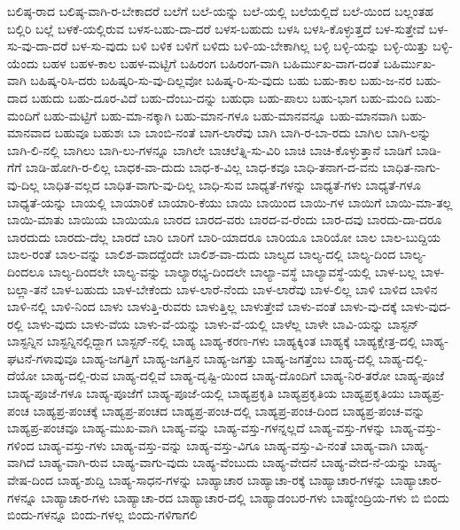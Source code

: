 {ಬಲಿಷ್ಠ-ರಾದ
ಬಲಿಷ್ಠ-ವಾಗಿ-ರ-ಬೇಕಾದರೆ
ಬಲೆಗೆ
ಬಲೆ-ಯನ್ನು
ಬಲೆ-ಯಲ್ಲಿ
ಬಲೆಯಲ್ಲಿದೆ
ಬಲೆ-ಯಿಂದ
ಬಲ್ಲಂತಹ
ಬಲ್ಲಿರಿ
ಬಲ್ಲೆ
ಬಳಕೆ-ಯಲ್ಲಿರುವ
ಬಳಸ-ಬಹು-ದಾ-ದರೆ
ಬಳಸ-ಬಹುದು
ಬಳಸಿ
ಬಳಸಿ-ಕೊಳ್ಳುತ್ತದೆ
ಬಳ-ಸುತ್ತೇವೆ
ಬಳ-ಸು-ವು-ದಾ-ದರೆ
ಬಳ-ಸು-ವುದು
ಬಳಿ
ಬಳಿಕ
ಬಳಿಗೆ
ಬಳಿದು
ಬಳಿ-ಯ-ಬೇಕಾಗಿಲ್ಲ
ಬಳ್ಳಿ
ಬಳ್ಳಿ-ಯನ್ನು
ಬಳ್ಳಿ-ಯಿತ್ತು
ಬಳ್ಳಿ-ಯೆಂದು
ಬಹಳ
ಬಹಳ-ಕಾಲ
ಬಹಳ-ಮಟ್ಟಿಗೆ
ಬಹಿರಂಗ
ಬಹಿರಂಗ-ವಾಗಿ
ಬಹಿರ್ಮುಖ-ವಾಗ-ದಂತೆ
ಬಹಿರ್ಮುಖ-ವಾಗಿ
ಬಹಿಷ್ಕ-ರಿಸಿ-ದರು
ಬಹಿಷ್ಕರಿ-ಸು-ವು-ದಿಲ್ಲವೋ
ಬಹಿಷ್ಕ-ರಿ-ಸು-ವುದು
ಬಹು
ಬಹು-ಕಾಲ
ಬಹು-ಜ-ನರ
ಬಹು-ದಾದ
ಬಹುದು
ಬಹು-ದೂರ-ವಿದೆ
ಬಹು-ದೆಂಬು-ದನ್ನು
ಬಹುಧಾ
ಬಹು-ಪಾಲು
ಬಹು-ಭಾಗ
ಬಹು-ಮಂದಿ
ಬಹು-ಮಂದಿಗೆ
ಬಹು-ಮಟ್ಟಿಗೆ
ಬಹು-ಮಾ-ನಕ್ಕಾಗಿ
ಬಹು-ಮಾನ-ಗಳೂ
ಬಹು-ಮಾನವನ್ನೂ
ಬಹು-ಮಾನವಾಗಿ
ಬಹು-ಮಾನವಾದ
ಬಹುವೂ
ಬಹುಶಃ
ಬಾ
ಬಾಂಬಿ-ನಂತೆ
ಬಾಗ-ಲಾರೆವು
ಬಾಗಿ
ಬಾಗಿ-ರ-ಬಾ-ರದು
ಬಾಗಿಲ
ಬಾಗಿ-ಲನ್ನು
ಬಾಗಿ-ಲಿ-ನಲ್ಲಿ
ಬಾಗಿಲು
ಬಾಗಿ-ಲು-ಗಳನ್ನೂ
ಬಾಗಿಲೇ
ಬಾಚಲೆತ್ನಿ-ಸು-ವಿರಿ
ಬಾಚಿ
ಬಾಚಿ-ಕೊಳ್ಳುತ್ತಾನೆ
ಬಾಡಿಗೆ
ಬಾಡಿ-ಗೆಗೆ
ಬಾಡಿ-ಹೋಗಿ-ರ-ಲಿಲ್ಲ
ಬಾಧಕ-ವಾ-ದುದು
ಬಾಧ-ಕ-ವಿಲ್ಲ
ಬಾಧ-ಕವೂ
ಬಾಧಿ-ತನಾಗ-ದ-ವನು
ಬಾಧಿತ-ನಾಗು-ವು-ದಿಲ್ಲ
ಬಾಧಿತ-ವಲ್ಲದ
ಬಾಧಿತ-ವಾಗು-ವು-ದಿಲ್ಲ
ಬಾಧಿ-ಸುವ
ಬಾಧ್ಯತೆ-ಗಳನ್ನು
ಬಾಧ್ಯತೆ-ಗಳು
ಬಾಧ್ಯತೆ-ಗಳೂ
ಬಾಧ್ಯತೆ-ಯನ್ನು
ಬಾಯಲ್ಲಿ
ಬಾಯಾರಿಕೆ
ಬಾಯಾರಿ-ಕೆಯು
ಬಾಯಿ
ಬಾಯಿಂದ
ಬಾಯಿ-ಗಳ
ಬಾಯಿಗೆ
ಬಾಯಿ-ಮಾ-ತಲ್ಲ
ಬಾಯಿ-ಮಾತು
ಬಾಯಿಯ
ಬಾಯಿಯೂ
ಬಾರದ
ಬಾರದ-ವರು
ಬಾರದ-ವ-ರೆಂದು
ಬಾರ-ದವು
ಬಾರದು-ದಾ-ದರೂ
ಬಾರದುದು
ಬಾರದು-ದೆಲ್ಲ
ಬಾರದೆ
ಬಾರಿ
ಬಾರಿಗೆ
ಬಾರಿ-ಯಾದರೂ
ಬಾರಿಯೂ
ಬಾರಿಯೋ
ಬಾಲ
ಬಾಲ-ಬುದ್ದಿಯ
ಬಾಲ-ರಂತೆ
ಬಾಲ-ವನ್ನು
ಬಾಲಿಶ-ವಾದದ್ದೆಂದೇ
ಬಾಲಿಶ-ವಾ-ದುದು
ಬಾಲ್ಯದ
ಬಾಲ್ಯ-ದಲ್ಲಿ
ಬಾಲ್ಯ-ದಿಂದ
ಬಾಲ್ಯ-ದಿಂದಲೂ
ಬಾಲ್ಯ-ದಿಂದಲೇ
ಬಾಲ್ಯ-ವನ್ನು
ಬಾಲ್ಯಾರಭ್ಯ-ದಿಂದಲೇ
ಬಾಲ್ಯಾ-ವಸ್ಥೆ
ಬಾಲ್ಯಾವಸ್ಥೆ-ಯಲ್ಲಿ
ಬಾಳ-ಬಲ್ಲ
ಬಾಳ-ಬಲ್ಲಾ-ತನೆ
ಬಾಳ-ಬಹುದು
ಬಾಳ-ಬೇಕೆಂದು
ಬಾಳ-ಲಾರೆ-ನೆಂದು
ಬಾಳ-ಲಾರೆವು
ಬಾಳ-ಲಿಲ್ಲ
ಬಾಳಿ
ಬಾಳಿದ
ಬಾಳಿನ
ಬಾಳಿ-ನಲ್ಲಿ
ಬಾಳಿ-ನಿಂದ
ಬಾಳು
ಬಾಳುತ್ತಿ-ರುವರು
ಬಾಳುತ್ತಿಲ್ಲ
ಬಾಳುತ್ತೇವೆ
ಬಾಳು-ವಂತೆ
ಬಾಳು-ವು-ದಕ್ಕೆ
ಬಾಳು-ವುದ-ರಲ್ಲಿ
ಬಾಳು-ವುದು
ಬಾಳು-ವೆಯ
ಬಾಳು-ವೆ-ಯನ್ನು
ಬಾಳು-ವೆ-ಯಲ್ಲಿ
ಬಾಳೆಲ್ಲ
ಬಾಳೇ
ಬಾವಿ-ಯನ್ನು
ಬಾಸ್ಟನ್
ಬಾಸ್ಟನ್ನಿನ
ಬಾಸ್ಟನ್ನಿನಲ್ಲಿದ್ದಾಗ
ಬಾಸ್ಟನ್-ನಲ್ಲಿ
ಬಾಹ್ಯ
ಬಾಹ್ಯ-ಕರಣ-ಗಳು
ಬಾಹ್ಯಕ್ಕಿಂತ
ಬಾಹ್ಯಕ್ಕೆ
ಬಾಹ್ಯಕ್ಷೇತ್ರ-ದಲ್ಲಿ
ಬಾಹ್ಯ-ಘಟನೆ-ಗಳಾವುವೂ
ಬಾಹ್ಯ-ಜಗತ್ತಿಗೆ
ಬಾಹ್ಯ-ಜಗತ್ತಿನ
ಬಾಹ್ಯ-ಜಗತ್ತು
ಬಾಹ್ಯ-ಜಗತ್ತೆಂಬ
ಬಾಹ್ಯ-ದಲ್ಲಿ
ಬಾಹ್ಯ-ದಲ್ಲಿ-ದೆಯೋ
ಬಾಹ್ಯ-ದಲ್ಲಿ-ರುವ
ಬಾಹ್ಯ-ದಲ್ಲಿವೆ
ಬಾಹ್ಯ-ದೃಷ್ಟಿ-ಯಿಂದ
ಬಾಹ್ಯ-ದೊಂದಿಗೆ
ಬಾಹ್ಯ-ನಿರ-ತರೋ
ಬಾಹ್ಯ-ಪೂಜೆ
ಬಾಹ್ಯ-ಪೂಜೆ-ಗಳೂ
ಬಾಹ್ಯ-ಪೂಜೆಗೆ
ಬಾಹ್ಯ-ಪೂಜೆ-ಯಲ್ಲಿ
ಬಾಹ್ಯಪ್ರಕೃತಿ
ಬಾಹ್ಯಪ್ರಕೃತಿಯ
ಬಾಹ್ಯಪ್ರಕೃತಿಯು
ಬಾಹ್ಯಪ್ರ-ಪಂಚ
ಬಾಹ್ಯಪ್ರ-ಪಂಚಕ್ಕೆ
ಬಾಹ್ಯಪ್ರ-ಪಂಚದ
ಬಾಹ್ಯಪ್ರ-ಪಂಚ-ದಲ್ಲಿ
ಬಾಹ್ಯಪ್ರ-ಪಂಚ-ದಿಂದ
ಬಾಹ್ಯಪ್ರ-ಪಂಚ-ವನ್ನು
ಬಾಹ್ಯಪ್ರ-ಪಂಚವೂ
ಬಾಹ್ಯ-ಮುಖ-ವಾಗಿ
ಬಾಹ್ಯ-ವನ್ನು
ಬಾಹ್ಯ-ವಸ್ತು-ಗಳನ್ನಲ್ಲದೆ
ಬಾಹ್ಯ-ವಸ್ತು-ಗಳನ್ನು
ಬಾಹ್ಯ-ವಸ್ತು-ಗಳಿಂದ
ಬಾಹ್ಯ-ವಸ್ತು-ಗಳು
ಬಾಹ್ಯ-ವಸ್ತು-ವನ್ನು
ಬಾಹ್ಯ-ವಸ್ತು-ವಿಗೂ
ಬಾಹ್ಯ-ವಸ್ತು-ವಿ-ನಂತೆ
ಬಾಹ್ಯ-ವಾಗಿ
ಬಾಹ್ಯ-ವಾಗಿದೆ
ಬಾಹ್ಯ-ವಾಗಿ-ರುವ
ಬಾಹ್ಯ-ವಾಗು-ವುದು
ಬಾಹ್ಯ-ವೆಂಬುದು
ಬಾಹ್ಯ-ವೇದನೆ
ಬಾಹ್ಯ-ವೇದ-ನೆ-ಯನ್ನು
ಬಾಹ್ಯ-ವೇಷ-ದಿಂದ
ಬಾಹ್ಯ-ಶುದ್ದಿ
ಬಾಹ್ಯ-ಸಾಧನ-ಗಳನ್ನು
ಬಾಹ್ಯಾಚಾರ
ಬಾಹ್ಯಾಚಾ-ರಕ್ಕೆ
ಬಾಹ್ಯಾಚಾರ-ಗಳನ್ನು
ಬಾಹ್ಯಾಚಾರ-ಗಳನ್ನೂ
ಬಾಹ್ಯಾಚಾರ-ಗಳು
ಬಾಹ್ಯಾಚಾ-ರದ
ಬಾಹ್ಯಾಚಾರ-ದಲ್ಲಿ
ಬಾಹ್ಯಾಡಂಬರ-ಗಳು
ಬಾಹ್ಯೇಂದ್ರಿಯ-ಗಳು
ಬಿ
ಬಿಂದು
ಬಿಂದು-ಗಳನ್ನೂ
ಬಿಂದು-ಗಳಲ್ಲ
ಬಿಂದು-ಗಳಿಗಾಗಲಿ
}
